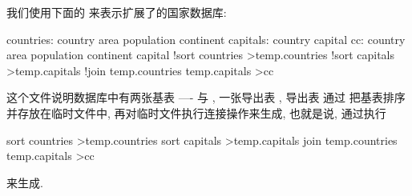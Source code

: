 我们使用下面的  来表示扩展了的国家数据库:
\begin{file}
    countries:
        country
        area
        population
        continent
    capitals:
        country
        capital
    cc:
        country
        area
        population
        continent
        capital
        !sort countries >temp.countries
        !sort capitals >temp.capitals
        !join temp.countries temp.capitals >cc
\end{file}
这个文件说明数据库中有两张基表 ----  与
, 一张导出表 , 导出表  通过 
把基表排序并存放在临时文件中, 再对临时文件执行连接操作来生成, 也就是说, 
 通过执行
\begin{shell}
    sort countries >temp.countries
    sort capitals >temp.capitals
    join temp.countries temp.capitals >cc
\end{shell}
来生成.
